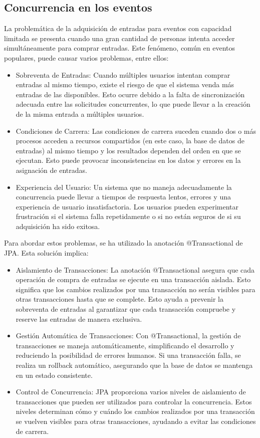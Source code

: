 \subsection{Concurrencia en los eventos}
\label{sec:concurrencia}
La problemática de la adquisición de entradas para eventos con capacidad limitada se presenta cuando una gran cantidad de personas intenta acceder simultáneamente
para comprar entradas. Este fenómeno, común en eventos populares, puede causar varios problemas, entre ellos:
\begin{itemize}
    \item Sobreventa de Entradas: Cuando múltiples usuarios intentan comprar entradas al mismo tiempo, existe el riesgo de que el sistema venda más entradas de las disponibles.
    Esto ocurre debido a la falta de sincronización adecuada entre las solicitudes concurrentes, lo que puede llevar a la creación de la misma entrada a múltiples usuarios.
    \item Condiciones de Carrera: Las condiciones de carrera suceden cuando dos o más procesos acceden a recursos compartidos (en este caso, la base de datos de entradas) al mismo
    tiempo y los resultados dependen del orden en que se ejecutan. Esto puede provocar inconsistencias en los datos y errores en la asignación de entradas.
    \item Experiencia del Usuario: Un sistema que no maneja adecuadamente la concurrencia puede llevar a tiempos de respuesta lentos, errores y una experiencia de usuario
    insatisfactoria. Los usuarios pueden experimentar frustración si el sistema falla repetidamente o si no están seguros de si su adquisición ha sido exitosa.   
\end{itemize}

Para abordar estos problemas, se ha utilizado la anotación @Transactional de JPA. Esta solución implica:
\begin{itemize}
    \item Aislamiento de Transacciones: La anotación @Transactional asegura que cada operación de compra de entradas se ejecute en una transacción aislada. Esto significa
    que los cambios realizados por una transacción no serán visibles para otras transacciones hasta que se complete. Esto ayuda a prevenir la sobreventa de entradas
    al garantizar que cada transacción compruebe y reserve las entradas de manera exclusiva.
    \item Gestión Automática de Transacciones: Con @Transactional, la gestión de transacciones se maneja automáticamente, simplificando el desarrollo y reduciendo la posibilidad
    de errores humanos. Si una transacción falla, se realiza un rollback automático, asegurando que la base de datos se mantenga en un estado consistente.
    \item Control de Concurrencia: JPA proporciona varios niveles de aislamiento de transacciones que pueden ser utilizados para controlar la concurrencia. Estos niveles determinan
    cómo y cuándo los cambios realizados por una transacción se vuelven visibles para otras transacciones, ayudando a evitar las condiciones de carrera.
\end{itemize}

